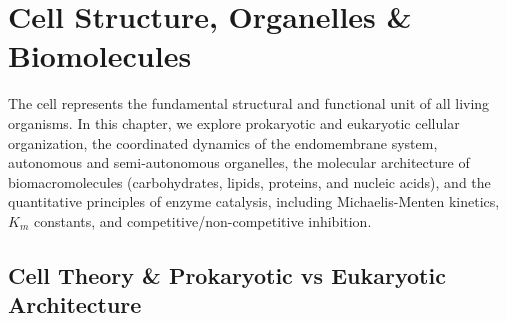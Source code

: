 \documentclass[10pt,twoside,openright]{book}
\begin{document}
\chapter{Cell Structure, Organelles \& Biomolecules}

The cell represents the fundamental structural and functional unit of all living organisms. In this chapter, we explore prokaryotic and eukaryotic cellular organization, the coordinated dynamics of the endomembrane system, autonomous and semi-autonomous organelles, the molecular architecture of biomacromolecules (carbohydrates, lipids, proteins, and nucleic acids), and the quantitative principles of enzyme catalysis, including Michaelis-Menten kinetics, $K_m$ constants, and competitive/non-competitive inhibition.

\section{Cell Theory \& Prokaryotic vs Eukaryotic Architecture}
\end{document}
